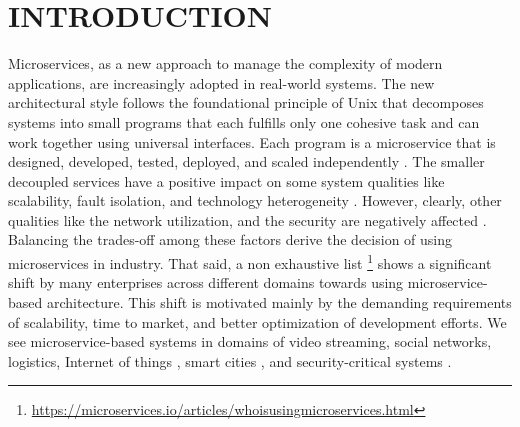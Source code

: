 \section{INTRODUCTION}

Microservices, as a new approach to manage the complexity of modern applications, are increasingly adopted in real-world systems. The new architectural style 
follows the foundational principle of Unix  that decomposes systems into small programs \cite{wolff2016microservices} that each fulfills only one cohesive task and can work together using universal interfaces. Each program is a microservice that is designed, developed, tested,  deployed, and scaled independently \cite{microservicesfrowler}. The smaller decoupled services have a positive impact on some system qualities like scalability, fault isolation, and technology heterogeneity \cite{newman2015building}. However, clearly, other qualities like the network utilization, and the security are negatively affected \cite{ahmadvand2016requirements}.  Balancing the trades-off among these factors derive the decision of using microservices in industry. That said, a non exhaustive list \footnote{\url{https://microservices.io/articles/whoisusingmicroservices.html}} shows a significant shift by many enterprises across different domains towards using microservice-based architecture. This shift is  motivated mainly by the demanding requirements of scalability, time to market, and better optimization of development efforts. We see microservice-based systems in domains of video streaming, social networks, logistics, Internet of things \cite{butzin2016microservices}, smart cities \cite{krylovskiy2015designing}, and security-critical systems \cite{fetzer2016building}. 

